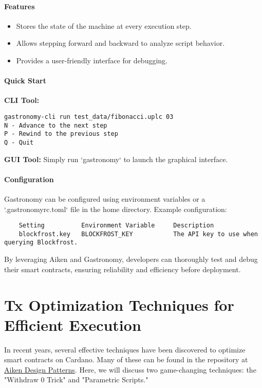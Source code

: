 \paragraph{Features}

\begin{itemize}
    \item Stores the state of the machine at every execution step.
    \item Allows stepping forward and backward to analyze script behavior.
    \item Provides a user-friendly interface for debugging.
\end{itemize}

\paragraph{Quick Start}

\textbf{CLI Tool:}
\begin{verbatim}
gastronomy-cli run test_data/fibonacci.uplc 03
N - Advance to the next step
P - Rewind to the previous step
Q - Quit
\end{verbatim}

\textbf{GUI Tool:}
Simply run `gastronomy` to launch the graphical interface.

\paragraph{Configuration}

Gastronomy can be configured using environment variables or a `.gastronomyrc.toml` file in the home directory. Example configuration:

\begin{verbatim}
    Setting          Environment Variable     Description
    blockfrost.key   BLOCKFROST_KEY           The API key to use when querying Blockfrost.
\end{verbatim}




By leveraging Aiken and Gastronomy, developers can thoroughly test and debug their smart contracts, ensuring reliability and efficiency before deployment.


\section{Tx Optimization Techniques for Efficient Execution}

In recent years, several effective techniques have been discovered to optimize smart contracts on Cardano. Many of these can be found in the repository at \href{https://github.com/Anastasia-Labs/aiken-design-patterns}{Aiken Design Patterns}. Here, we will discuss two game-changing techniques: the "Withdraw 0 Trick" and "Parametric Scripts."

